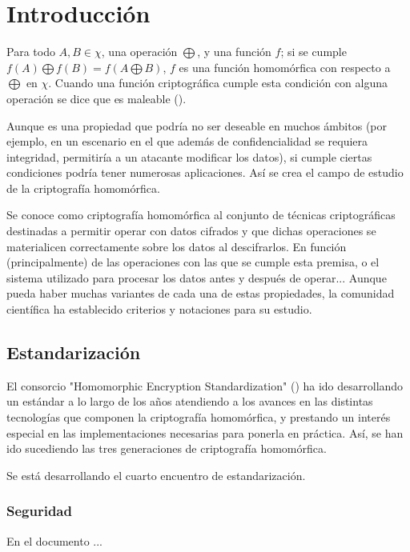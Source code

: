 \chapter{Introducción}
\label{chap:intro}

Para todo $ A,B \in \chi{} $, una operación $ \bigoplus $, y una función $f$; si se cumple $ f(A) \bigoplus f(B) = f(A \bigoplus B)$, $ f $ es una función homomórfica con respecto a $ \bigoplus $ en $ \chi{} $. Cuando una función criptográfica cumple esta condición con alguna operación se dice que es maleable (\cite{dolev_non-malleable_1991}). 

Aunque es una propiedad que podría no ser deseable en muchos ámbitos (por ejemplo, en un escenario en el que además de confidencialidad se requiera integridad, permitiría a un atacante modificar los datos), si cumple ciertas condiciones podría tener numerosas aplicaciones. Así se crea el campo de estudio de la criptografía homomórfica.

Se conoce como criptografía homomórfica al conjunto de técnicas criptográficas destinadas a permitir operar con datos cifrados y que dichas operaciones se materialicen correctamente sobre los datos al descifrarlos. En función (principalmente) de las operaciones con las que se cumple esta premisa, o el sistema utilizado para procesar los datos antes y después de operar... Aunque pueda haber muchas variantes de cada una de estas propiedades, la comunidad científica ha establecido criterios y notaciones para su estudio. 

\section{Estandarización}

El consorcio "Homomorphic Encryption Standardization" (\cite{noauthor_homomorphic_nodate-1}) ha ido desarrollando un estándar a lo largo de los años atendiendo a los avances en las distintas tecnologías que componen la criptografía homomórfica, y prestando un interés especial en las implementaciones necesarias para ponerla en práctica. Así, se han ido sucediendo las tres generaciones de criptografía homomórfica.

Se está desarrollando el cuarto encuentro de estandarización.

\subsection{Seguridad}

En el documento \cite{chase_security_2017} ...

